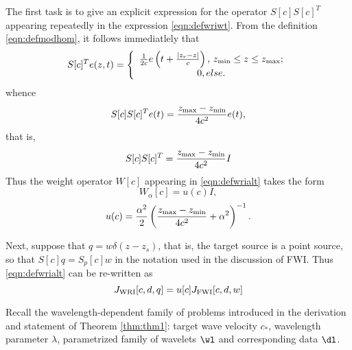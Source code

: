The first task is to give an explicit expression for the operator $S[c]S[c]^T$ appearing repeatedly in the expression \ref{eqn:defwriwt}. From the definition \ref{eqn:defmodhom}, it follows immediatlely that 
\begin{equation}
  \label{eqn:modhomtrans}
S[c]^Te(z,t)=
\left\{
    \begin{array}{c}
      \frac{1}{2c}e\left(t +  \frac{|z_r-z|}{c}\right), \,z_{\rm min} \le z \le z_{\rm max};\\
      0, else.
    \end{array}
  \right.
\end{equation}
whence
\[
  S[c]S[c]^Te(t) = \frac{z_{\rm max}-z_{\rm min}}{4c^2}e(t),
\]
that is,
\begin{equation}
  \label{eqn:modhomnormal}
  S[c]S[c]^T = \frac{z_{\rm max}-z_{\rm min}}{4c^2}I
\end{equation}
Thus the weight operator $W[c]$ appearing in \ref{eqn:defwrialt} takes
the form
\[
  W_{\alpha}[c] = u(c) I,
\]
\begin{equation}
  \label{eqn:wriwthom}
u(c) = \frac{\alpha^2}{2}\left(\frac{z_{\rm max}-z_{\rm min}}{4c^2}+\alpha^2\right)^{-1}.
\end{equation}

Next, suppose that $q = w\delta(z-z_s)$, that is, the target source is
a point source, so that $S[c]q = S_p[c]w$ in the notation used in
the discussion of FWI. Thus \ref{eqn:defwrialt} can be re-written as
\begin{equation}
  \label{eqn:wriscrewed}
  J_{\rm WRI}[c,d,q]=u[c]J_{\rm FWI}[c,d,w]
\end{equation}

Recall the wavelength-dependent family of problems introduced in the derivation and
statement of Theorem \ref{thm:thm1}: target wave velocity $c_*$, wavelength parameter
$\lambda$, parametrized family of wavelets $\wl$ and corresponding
data $\dl$.

